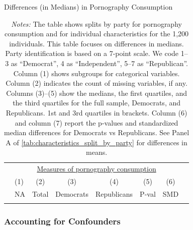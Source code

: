 \documentclass[12pt,twoside]{article}
\begin{document}
\begin{table}[ht] \centering \normalsize \setlength\tabcolsep{5 pt}
	\caption{Differences (in Medians) in Pornography Consumption}
	\label{tab:characteristics_split_by_party_medians}
	\begin{adjustbox}{max width=\textwidth}
		\begin{tabular}{@{\hspace{0\tabcolsep}}llrcccrr@{\hspace{0\tabcolsep}}}
			\toprule
			&\multicolumn{6}{c}{\underline{Measures of pornography consumption}}\\
			&\multicolumn{1}{l}{(1)}&\multicolumn{1}{c}{(2)}&\multicolumn{1}{c}{(3)}&\multicolumn{1}{c}{(4)}&\multicolumn{1}{c}{(5)}&\multicolumn{1}{c}{(6)}\\			
			&\multicolumn{1}{c}{NA}&\multicolumn{1}{c}{Total}&\multicolumn{1}{c}{Democrats}&\multicolumn{1}{c}{Republicans}&\multicolumn{1}{c}{P-val}&\multicolumn{1}{r}{SMD}\\
			\cmidrule{2-7}
			\\
			\bottomrule
		\end{tabular}
	\end{adjustbox}
	\caption*{\footnotesize \emph{Notes:}
		The table shows splits by party for pornography consumption and for individual characteristics for the 1,200 individuals.
		This table focuses on differences in medians.
		Party identification is based on a 7-point scale. We code 1--3 as ``Democrat'', 4 as ``Independent'', 5--7 as ``Republican''.
		Column (1) shows subgroups for categorical variables.
		Column (2) indicates the count of missing variables, if any.
		Columns (3)--(5) show the medians, the first quartiles, and the third quartiles for the full sample, Democrats, and Republicans.
		1st and 3rd quartiles in brackets.
		Column (6) and column (7) report the p-values and standardized median differences for Democrats vs Republicans.
		See Panel A of \cref{tab:characteristics_split_by_party} for differences in means.
	}
\end{table}


\FloatBarrier
\clearpage
\subsubsection{Accounting for Confounders}
\end{document}
